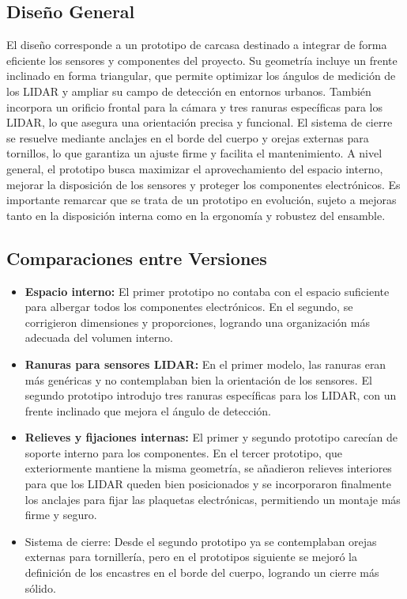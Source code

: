 \documentclass[12pt,a4paper]{article}
\begin{document}
\subsection{Diseño General}
El diseño corresponde a un prototipo de carcasa destinado a integrar de forma eficiente los sensores y componentes del proyecto. Su geometría incluye un frente inclinado en forma triangular, que permite optimizar los ángulos de medición de los LIDAR y ampliar su campo de detección en entornos urbanos. También incorpora un orificio frontal para la cámara y tres ranuras específicas para los LIDAR, lo que asegura una orientación precisa y funcional. El sistema de cierre se resuelve mediante anclajes en el borde del cuerpo y orejas externas para tornillos, lo que garantiza un ajuste firme y facilita el mantenimiento. A nivel general, el prototipo busca maximizar el aprovechamiento del espacio interno, mejorar la disposición de los sensores y proteger los componentes electrónicos. Es importante remarcar que se trata de un prototipo en evolución, sujeto a mejoras tanto en la disposición interna como en la ergonomía y robustez del ensamble.

\subsection{Comparaciones entre Versiones}
\begin{itemize}
\item \textbf{Espacio interno:} El primer prototipo no contaba con el espacio suficiente para albergar todos los componentes electrónicos. En el segundo, se corrigieron dimensiones y proporciones, logrando una organización más adecuada del volumen interno.
\item \textbf{Ranuras para sensores LIDAR:} En el primer modelo, las ranuras eran más genéricas y no contemplaban bien la orientación de los sensores. El segundo prototipo introdujo tres ranuras específicas para los LIDAR, con un frente inclinado que mejora el ángulo de detección.
\item \textbf{Relieves y fijaciones internas:} El primer y segundo prototipo carecían de soporte interno para los componentes. En el tercer prototipo, que exteriormente mantiene la misma geometría, se añadieron relieves interiores para que los LIDAR queden bien posicionados y se incorporaron finalmente los anclajes para fijar las plaquetas electrónicas, permitiendo un montaje más firme y seguro.
\item Sistema de cierre: Desde el segundo prototipo ya se contemplaban orejas externas para tornillería, pero en el prototipos siguiente se mejoró la definición de los encastres en el borde del cuerpo, logrando un cierre más sólido.
\end{itemize}
\end{document}
